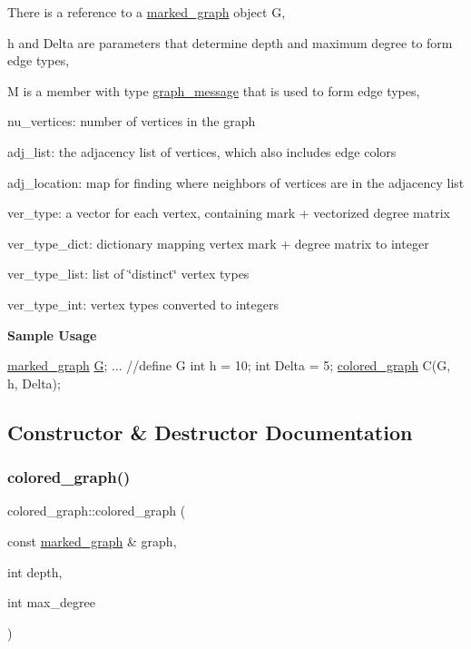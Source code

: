 \begin{DoxyItemize}
\item There is a reference to a \hyperlink{classmarked__graph}{marked\+\_\+graph} object G,
\item h and Delta are parameters that determine depth and maximum degree to form edge types,
\item M is a member with type \hyperlink{classgraph__message}{graph\+\_\+message} that is used to form edge types,
\item nu\+\_\+vertices\+: number of vertices in the graph
\item adj\+\_\+list\+: the adjacency list of vertices, which also includes edge colors
\item adj\+\_\+location\+: map for finding where neighbors of vertices are in the adjacency list
\item ver\+\_\+type\+: a vector for each vertex, containing mark + vectorized degree matrix
\item ver\+\_\+type\+\_\+dict\+: dictionary mapping vertex mark + degree matrix to integer
\item ver\+\_\+type\+\_\+list\+: list of \char`\"{}distinct\char`\"{} vertex types
\item ver\+\_\+type\+\_\+int\+: vertex types converted to integers
\end{DoxyItemize}

{\bfseries Sample Usage}


\begin{DoxyCode}
\hyperlink{classmarked__graph}{marked\_graph} \hyperlink{classcolored__graph_a39186b56cad58c368d6947656976e18d}{G};
... \textcolor{comment}{//define G}
\textcolor{keywordtype}{int} h = 10;
\textcolor{keywordtype}{int} Delta = 5;
\hyperlink{classcolored__graph}{colored\_graph} C(G, h, Delta);
\end{DoxyCode}
 

\subsection{Constructor \& Destructor Documentation}
\mbox{\label{classcolored__graph_a0374481a0474ac8e9b77689f74b5ed9b}} 
\subsubsection{\texorpdfstring{colored\+\_\+graph()}{colored\_graph()}}
{\footnotesize\ttfamily colored\+\_\+graph\+::colored\+\_\+graph (\begin{DoxyParamCaption}\item[{const \hyperlink{classmarked__graph}{marked\+\_\+graph} \&}]{graph,  }\item[{int}]{depth,  }\item[{int}]{max\+\_\+degree }\end{DoxyParamCaption})\hspace{0.3cm}{\ttfamily [inline]}}



